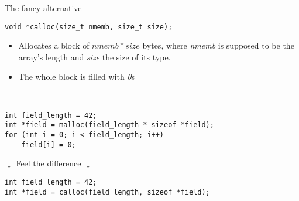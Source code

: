 \begin{frame}[fragile]{The fancy alternative}
		\begin{lstlisting}[numbers=none]
void *calloc(size_t nmemb, size_t size);
\end{lstlisting}
	\begin{itemize}
		\item Allocates a block of $nmemb * size$ bytes, where \textit{nmemb} is supposed to be the array's length and \textit{size} the size of its type.
		\item The whole block is filled with \textit{0}s
	\end{itemize}
	\ \\
	\begin{lstlisting}[numbers=none]
int field_length = 42;
int *field = malloc(field_length * sizeof *field);
for (int i = 0; i < field_length; i++)
	field[i] = 0;
\end{lstlisting}
	\center	$\downarrow$ Feel the difference $\downarrow$
	\begin{lstlisting}[numbers=none]
int field_length = 42;
int *field = calloc(field_length, sizeof *field);
\end{lstlisting}
\end{frame}

